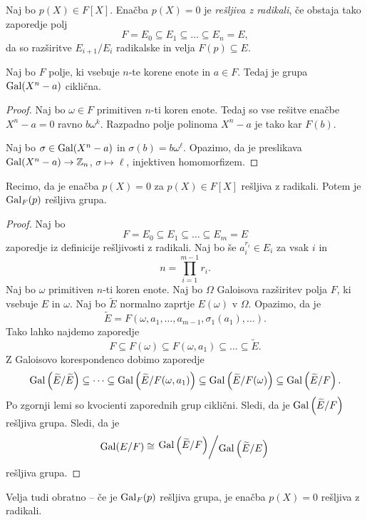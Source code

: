 \begin{definicija}
Naj bo $p(X) \in F[X]$. Enačba $p(X) = 0$ je
\emph{rešljiva z radikali}, če
obstaja tako zaporedje polj
\[
F = E_0 \subseteq E_1 \subseteq \dots \subseteq E_n = E,
\]
da so razširitve $E_{i+1}/E_i$ radikalske in velja
$F(p) \subseteq E$.
\end{definicija}

\begin{lema}
Naj bo $F$ polje, ki vsebuje $n$-te korene enote in $a \in F$.
Tedaj je grupa $\operatorname{Gal}(X^n-a)$ ciklična.
\end{lema}

\begin{proof}
Naj bo $\omega \in F$ primitiven $n$-ti koren enote. Tedaj so vse
rešitve enačbe $X^n - a = 0$ ravno $b \omega^k$. Razpadno polje
polinoma $X^n - a$ je tako kar $F(b)$.

Naj bo $\sigma \in \operatorname{Gal}(X^n - a)$ in $\sigma(b) = b \omega^\ell$.
Opazimo, da je preslikava $\operatorname{Gal}(X^n - a) \to \mathbb{Z}_n$,
$\sigma \mapsto \ell$, injektiven homomorfizem.
\end{proof}

\begin{izrek}
Recimo, da je enačba $p(X) = 0$ za $p(X) \in F[X]$ rešljiva z
radikali. Potem je $\operatorname{Gal}_F(p)$ rešljiva grupa.
\end{izrek}

\begin{proof}
Naj bo
\[
F = E_0 \subseteq E_1 \subseteq \dots \subseteq E_m = E
\]
zaporedje iz definicije rešljivosti z radikali. Naj bo še
$a_i^{r_i} \in E_i$ za vsak $i$ in
\[
n = \prod_{i=1}^{m-1} r_i.
\]
Naj bo $\omega$ primitiven $n$-ti koren enote. Naj bo $\Omega$
Galoisova razširitev polja $F$, ki vsebuje $E$ in $\omega$. Naj bo
$\widetilde{E}$ normalno zaprtje $E(\omega)$ v $\Omega$. Opazimo,
da je
\[
\widetilde{E} =
F(\omega, a_1, \dots, a_{m-1}, \sigma_1(a_1), \dots).
\]
Tako lahko najdemo zaporedje
\[
F \subseteq F(\omega) \subseteq F(\omega, a_1) \subseteq
\dots \subseteq \widetilde{E}.
\]
Z Galoisovo korespondenco dobimo zaporedje
\[
\operatorname{Gal} \left(\widetilde{E}/\widetilde{E}\right) \subseteq \dots \subseteq
\operatorname{Gal} \left(\widetilde{E}/F(\omega, a_1)\right) \subseteq
\operatorname{Gal} \left(\widetilde{E}/F(\omega)\right) \subseteq
\operatorname{Gal} \left(\widetilde{E}/F\right).
\]
Po zgornji lemi so kvocienti zaporednih grup ciklični. Sledi, da je
$\operatorname{Gal} \left(\widetilde{E}/F\right)$ rešljiva grupa. Sledi, da je
\[
\Gal(E/F) \cong
\kvoc{\Gal \br{\widetilde{E}/F}}{\Gal \br{\widetilde{E}/E}}
\]
rešljiva grupa.
\end{proof}

\begin{opomba}
Velja tudi obratno -- če je $\operatorname{Gal}_F(p)$ rešljiva grupa, je enačba
$p(X) = 0$ rešljiva z radikali.
\end{opomba}

